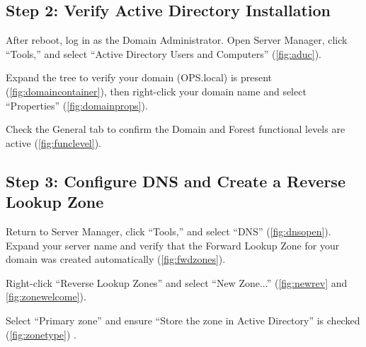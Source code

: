 
\subsection{Step 2: Verify Active Directory Installation}
\label{sec:step2}
After reboot, log in as the Domain Administrator. Open Server Manager, click ``Tools,'' and select ``Active Directory Users and Computers'' (\autoref{fig:aduc}).


Expand the tree to verify your domain (OPS.local) is present (\autoref{fig:domaincontainer}), then right-click your domain name and select ``Properties'' (\autoref{fig:domainprops}).


Check the General tab to confirm the Domain and Forest functional levels are active (\autoref{fig:funclevel}).


\subsection{Step 3: Configure DNS and Create a Reverse Lookup Zone}
\label{sec:step3}
Return to Server Manager, click ``Tools,'' and select ``DNS'' (\autoref{fig:dnsopen}). Expand your server name and verify that the Forward Lookup Zone for your domain was created automatically (\autoref{fig:fwdzones}).


Right-click ``Reverse Lookup Zones'' and select ``New Zone...'' (\autoref{fig:newrev} and \autoref{fig:zonewelcome}).


Select ``Primary zone'' and ensure ``Store the zone in Active Directory'' is checked (\autoref{fig:zonetype}) \cite{msft-dns-integration}.

